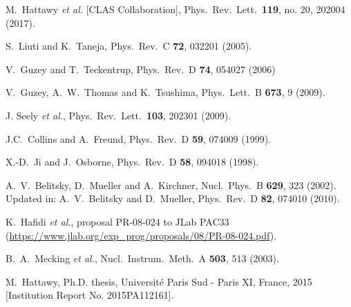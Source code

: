 \documentclass[twocolumn,nofootinbib,showpacs,prl,superscriptaddress,secnumarabic,amssymb,nobibnotes,aps,floatfix]{revtex4}
\begin{document}
\begin{thebibliography}{99}
   M.~Hattawy {\it et al.} [CLAS Collaboration],
   Phys.\ Rev.\ Lett.\  {\bf 119}, no. 20, 202004 (2017).


S.~Liuti and K.~Taneja, Phys.\ Rev.\ C {\bf 72}, 032201 (2005).

 V.~Guzey and T.~Teckentrup, Phys.\ Rev.\ D {\bf 74}, 
   054027 (2006)

 V.~Guzey, A.~W.~Thomas and K.~Tsushima,
  Phys.\ Lett.\ B {\bf 673}, 9 (2009).

J. Seely {\it et al.}, Phys.\ Rev.\ Lett.\ {\bf 103}, 202301 (2009).


J.C.~Collins and A.~Freund, Phys.\ Rev.\ D {\bf 59}, 074009 (1999).

   X.-D.~Ji and J.~Osborne, Phys.\ Rev.\ D {\bf 58}, 094018 (1998).

A.~V.~Belitsky, D.~Mueller and A.~Kirchner, Nucl.\ Phys.\ B {\bf 629}, 323 
(2002). Updated in: A.~V.~Belitsky and D.~Mueller, Phys.\ Rev.\ D {\bf 82}, 
074010 (2010).


 K.~Hafidi {\it et al.},
   proposal PR-08-024 to JLab PAC33 
   (\url{https://www.jlab.org/exp_prog/proposals/08/PR-08-024.pdf}).

 B.~A.~Mecking {\it et al.},
   Nucl.\ Instrum.\ Meth.\ A {\bf 503}, 513 (2003).

M.~Hattawy, Ph.D. thesis, Universit{\'e} Paris Sud - Paris XI, France, 2015 
[Institution Report No. 2015PA112161].


\end{thebibliography}
\end{document}
